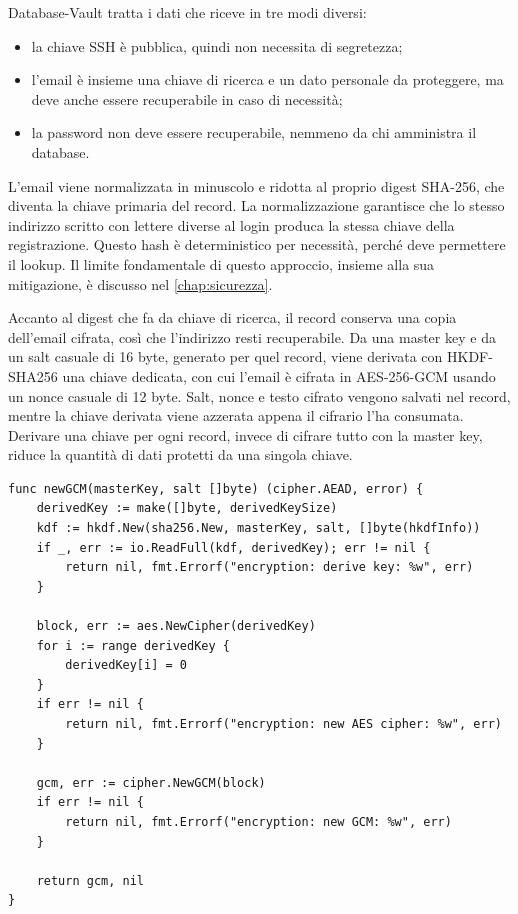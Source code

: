 Database-Vault tratta i dati che riceve in tre modi diversi:

\begin{itemize}
    \item la chiave SSH è pubblica, quindi non necessita di segretezza;
    \item l'email è insieme una chiave di ricerca e un dato personale da proteggere, ma deve anche essere 
		recuperabile in caso di necessità;
    \item la password non deve essere recuperabile, nemmeno da chi amministra il database.
\end{itemize}

L'email viene normalizzata in minuscolo e ridotta al proprio digest SHA-256, che diventa la chiave primaria 
del record. La normalizzazione garantisce che lo stesso indirizzo scritto con lettere diverse al login 
produca la stessa chiave della registrazione.
Questo hash è deterministico per necessità, perché deve permettere il lookup. Il limite fondamentale di 
questo approccio, insieme alla sua mitigazione, è discusso nel \autoref{chap:sicurezza}.

Accanto al digest che fa da chiave di ricerca, il record conserva una copia dell'email cifrata,
così che l'indirizzo resti recuperabile. 
Da una master key e da un salt casuale di 16 byte, generato per quel record,
viene derivata con HKDF-SHA256 \cite{rfc5869} una chiave dedicata, con cui l'email è cifrata in
AES-256-GCM \cite{nist-sp-800-38d} usando un nonce casuale di 12 byte. Salt, nonce e testo cifrato
vengono salvati nel record, mentre la chiave derivata viene azzerata appena il cifrario l'ha consumata.
Derivare una chiave per ogni record, invece di cifrare tutto con la master key, riduce la quantità
di dati protetti da una singola chiave.

\begin{lstlisting}[caption={Derivazione della chiave per record in \texttt{newGCM}, da
\texttt{encryption.go} \cite{ramusb-code-hkdf-newgcm}.}, label={lst:hkdf}]
func newGCM(masterKey, salt []byte) (cipher.AEAD, error) {
	derivedKey := make([]byte, derivedKeySize)
	kdf := hkdf.New(sha256.New, masterKey, salt, []byte(hkdfInfo))
	if _, err := io.ReadFull(kdf, derivedKey); err != nil {
		return nil, fmt.Errorf("encryption: derive key: %w", err)
	}

	block, err := aes.NewCipher(derivedKey)
	for i := range derivedKey {
		derivedKey[i] = 0
	}
	if err != nil {
		return nil, fmt.Errorf("encryption: new AES cipher: %w", err)
	}

	gcm, err := cipher.NewGCM(block)
	if err != nil {
		return nil, fmt.Errorf("encryption: new GCM: %w", err)
	}

	return gcm, nil
}
\end{lstlisting}


